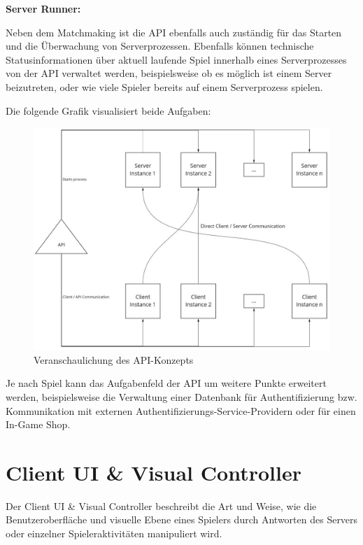\textbf{Server Runner:}

Neben dem Matchmaking ist die API ebenfalls auch zuständig für das Starten und die Überwachung von Serverprozessen.
Ebenfalls können technische Statusinformationen über aktuell laufende Spiel innerhalb eines Serverprozesses von der API verwaltet werden, beispielsweise ob es möglich ist einem Server beizutreten, oder wie viele Spieler bereits auf einem Serverprozess spielen.

Die folgende Grafik visualisiert beide Aufgaben:

\begin{figure}[H]
	\centering
	\includegraphics[width=150mm]{images/API_Konzept_Diagramm.jpg}
	\caption[API Konzept Diagramm]{Veranschaulichung des API-Konzepts}
	\label{pic:API_Konzept_Diagramm}
\end{figure}

Je nach Spiel kann das Aufgabenfeld der API um weitere Punkte erweitert werden, beispielsweise die Verwaltung einer Datenbank für Authentifizierung bzw. Kommunikation mit externen Authentifizierungs-Service-Providern oder für einen In-Game Shop.

\section{Client UI \& Visual Controller}

Der Client UI \& Visual Controller beschreibt die Art und Weise, wie die Benutzeroberfläche und visuelle Ebene eines Spielers durch Antworten des Servers oder einzelner Spieleraktivitäten manipuliert wird.

